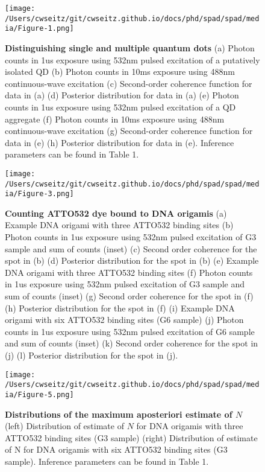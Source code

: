 \begin{figure}
\centering
\texttt{[image: /Users/cwseitz/git/cwseitz.github.io/docs/phd/spad/spad/media/Figure-1.png]}
\caption{\textbf{Distinguishing single and multiple quantum dots} (a) Photon counts in 1us exposure using 532nm pulsed excitation of a putatively isolated QD (b) Photon counts in 10ms exposure using 488nm continuous-wave excitation (c) Second-order coherence function for data in (a) (d) Posterior distribution for data in (a) (e) Photon counts in 1us exposure using 532nm pulsed excitation of a QD aggregate (f) Photon counts in 10ms exposure using 488nm continuous-wave excitation (g) Second-order coherence function for data in (e) (h) Posterior distribution for data in (e). Inference parameters can be found in Table 1.}
\label{fig:qdagg}
\end{figure}  

\clearpage
\begin{figure}
\centering
\texttt{[image: /Users/cwseitz/git/cwseitz.github.io/docs/phd/spad/spad/media/Figure-3.png]}
\caption{\textbf{Counting ATTO532 dye bound to DNA origamis} (a) Example DNA origami with three ATTO532 binding sites (b) Photon counts in 1us exposure using 532nm pulsed excitation of G3 sample and sum of counts (inset) (c) Second order coherence for the spot in (b) (d) Posterior distribution for the spot in (b) (e) Example DNA origami with three ATTO532 binding sites (f) Photon counts in 1us exposure using 532nm pulsed excitation of G3 sample and sum of counts (inset) (g) Second order coherence for the spot in (f) (h) Posterior distribution for the spot in (f) (i) Example DNA origami with six ATTO532 binding sites (G6 sample) (j) Photon counts in 1us exposure using 532nm pulsed excitation of G6 sample and sum of counts (inset) (k) Second order coherence for the spot in (j) (l) Posterior distribution for the spot in (j).}
\label{fig:atto}
\end{figure}  

\clearpage
\begin{figure}
\centering
\texttt{[image: /Users/cwseitz/git/cwseitz.github.io/docs/phd/spad/spad/media/Figure-5.png]}
\caption{\textbf{Distributions of the maximum aposteriori estimate of $N$} (left) Distribution of estimate of $N$ for DNA origamis with three ATTO532 binding sites (G3 sample) (right) Distribution of estimate of N for DNA origamis with six ATTO532 binding sites (G3 sample). Inference parameters can be found in Table 1.}
\label{fig:atto2}
\end{figure}  

